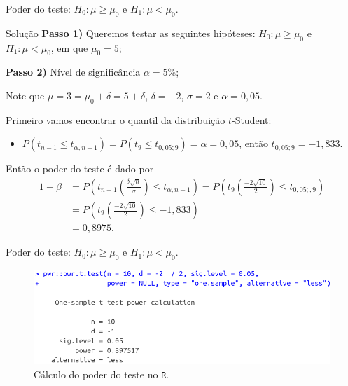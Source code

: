 \documentclass[8pt]{beamer}
\begin{document}
\begin{frame}{Poder do teste: $H_0:\mu \geq \mu_0$ e $H_1: \mu < \mu_0$.}

\large

\begin{block}{Solução}
	\textbf{Passo 1)} Queremos testar as seguintes hipóteses: $H_0: \mu \geq \mu_0$ e $H_1: \mu < \mu_0$, em que $\mu_0=5$;
	
	\textbf{Passo 2)} Nível de significância $\alpha = 5\%$;
	
	
	Note que $\mu=3=\mu_0 + \delta = 5 + \delta$, $\delta = -2$, $\sigma = 2$ e $\alpha=0,05$.
	
	Primeiro vamos encontrar o quantil da distribuição $t$-Student:
	\begin{itemize}
		\item $P\left( t_{n-1} \leq t_{\alpha, n-1} \right) = P\left( t_9 \leq t_{0,05; 9} \right) = \alpha = 0,05$, então $t_{0,05; 9} = -1,833$.
	\end{itemize}
	
	Então o poder do teste é dado por
	\begin{align*}
		1-\beta &= P \left( t_{n-1}\left( \frac{\delta\sqrt{n}}{\sigma}\right) \leq t_{\alpha, n-1}  \right) = P \left( t_{9}\left( \frac{-2\sqrt{10}}{2}\right) \leq t_{0,05;, 9} \right) \\ 
		&= P \left( t_{9}\left( \frac{-2\sqrt{10}}{2}\right) \leq -1,833 \right)\\
		&= 0,8975.
	\end{align*}
\end{block}

\normalsize

\end{frame}

\begin{frame}{Poder do teste: $H_0:\mu \geq \mu_0$ e $H_1: \mu < \mu_0$.}

\begin{figure}[htbp]
	\centering
	\caption{Cálculo do poder do teste no \texttt{R}.}
	\includegraphics[width=0.9\linewidth]{figures/t-noncentral-power-unilateral-lower-R.png}
\end{figure}

\end{frame}
\end{document}

